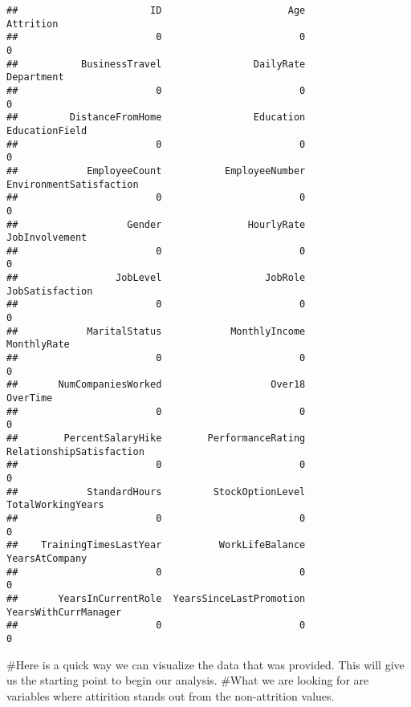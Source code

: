 \documentclass[]{article}
\begin{document}
\begin{verbatim}
##                       ID                      Age                Attrition 
##                        0                        0                        0 
##           BusinessTravel                DailyRate               Department 
##                        0                        0                        0 
##         DistanceFromHome                Education           EducationField 
##                        0                        0                        0 
##            EmployeeCount           EmployeeNumber  EnvironmentSatisfaction 
##                        0                        0                        0 
##                   Gender               HourlyRate           JobInvolvement 
##                        0                        0                        0 
##                 JobLevel                  JobRole          JobSatisfaction 
##                        0                        0                        0 
##            MaritalStatus            MonthlyIncome              MonthlyRate 
##                        0                        0                        0 
##       NumCompaniesWorked                   Over18                 OverTime 
##                        0                        0                        0 
##        PercentSalaryHike        PerformanceRating RelationshipSatisfaction 
##                        0                        0                        0 
##            StandardHours         StockOptionLevel        TotalWorkingYears 
##                        0                        0                        0 
##    TrainingTimesLastYear          WorkLifeBalance           YearsAtCompany 
##                        0                        0                        0 
##       YearsInCurrentRole  YearsSinceLastPromotion     YearsWithCurrManager 
##                        0                        0                        0
\end{verbatim}

\#Here is a quick way we can visualize the data that was provided. This
will give us the starting point to begin our analysis. \#What we are
looking for are variables where attirition stands out from the
non-attrition values.
\end{document}
